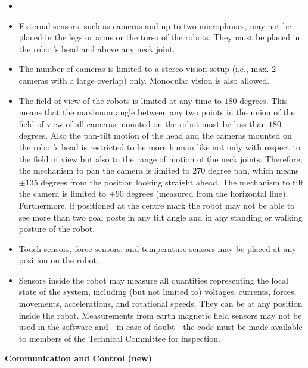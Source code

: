 \begin{itemize}
\item {} 
\item External sensors, such as cameras and up to two microphones, may not be placed in the legs or arms or the
torso of the robots. They must be placed in the robot's
head and above any neck joint. 
\item The number of cameras is limited to a stereo vision setup (i.e., max. 2 cameras with a large overlap) only. Monocular vision is also allowed.
\item The field of view of the robots is limited at any time to $180$ degrees. This means that the maximum angle between any two points in the union of the field of view of all cameras mounted on the robot must be less than $180$ degrees. Also the pan-tilt motion of the head and the cameras mounted on the robot's head is restricted to be more human like not only with respect to the field of view but also to the range of motion of the neck joints. Therefore, the mechanism to pan the camera is limited to $270$ degree pan, which means $\pm135$ degrees from the position looking straight ahead. The mechanism to tilt the camera is limited to $\pm90$ degrees (measured from the horizontal line). Furthermore, if positioned at the centre mark the robot may not be able to see more than two goal posts in any tilt angle and in any standing or walking posture of the robot. 
\item Touch sensors, force sensors, and temperature sensors may be placed at any position on the robot.
\item Sensors inside the robot may measure all quantities representing the local state of the system, including (but not limited to) voltages, currents, forces, movements, accelerations, and rotational speeds. They can be at any position inside the robot. Measurements from earth magnetic field sensors may not be used in the software and - in case of doubt - the code must be made available to members of the Technical Committee for inspection.
\end{itemize}

{\bfseries Communication and Control (new)}

